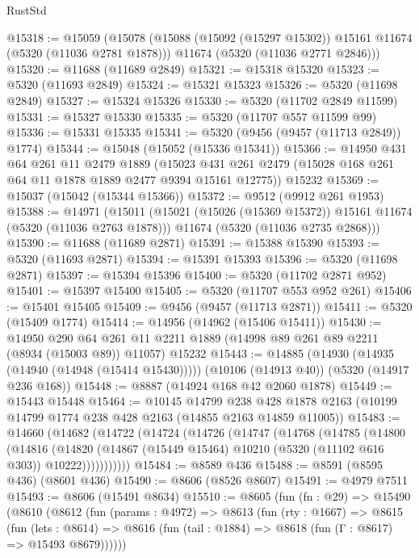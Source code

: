 \begin{lexlean}{RustStd}
\begin{coremodule}
@15318 := @15059
    (@15078
      (@15088 (@15092 (@15297 @15302)) @15161 @11674 (@5320 (@11036 @2781 @1878)))
      @11674
      (@5320 (@11036 @2771 @2846)))
@15320 := @11688 (@11689 @2849)
@15321 := @15318 @15320
@15323 := @5320 (@11693 @2849)
@15324 := @15321 @15323
@15326 := @5320 (@11698 @2849)
@15327 := @15324 @15326
@15330 := @5320 (@11702 @2849 @11599)
@15331 := @15327 @15330
@15335 := @5320 (@11707 @557 @11599 @99)
@15336 := @15331 @15335
@15341 := @5320 (@9456 (@9457 (@11713 @2849)) @1774)
@15344 := @15048 (@15052 (@15336 @15341))
@15366 := @14950
    @431
    @64
    @261
    @11
    @2479
    @1889
    (@15023 @431 @261 @2479 (@15028 @168 @261 @64 @11 @1878 @1889 @2477 @9394 @15161 @12775))
    @15232
@15369 := @15037 (@15042 (@15344 @15366))
@15372 := @9512 (@9912 @261 @1953)
@15388 := @14971
    (@15011
      (@15021 (@15026 (@15369 @15372)) @15161 @11674 (@5320 (@11036 @2763 @1878)))
      @11674
      (@5320 (@11036 @2735 @2868)))
@15390 := @11688 (@11689 @2871)
@15391 := @15388 @15390
@15393 := @5320 (@11693 @2871)
@15394 := @15391 @15393
@15396 := @5320 (@11698 @2871)
@15397 := @15394 @15396
@15400 := @5320 (@11702 @2871 @952)
@15401 := @15397 @15400
@15405 := @5320 (@11707 @553 @952 @261)
@15406 := @15401 @15405
@15409 := @9456 (@9457 (@11713 @2871))
@15411 := @5320 (@15409 @1774)
@15414 := @14956 (@14962 (@15406 @15411))
@15430 := @14950
    @290
    @64
    @261
    @11
    @2211
    @1889
    (@14998 @89 @261 @89 @2211 (@8934 (@15003 @89)) @11057)
    @15232
@15443 := @14885
    (@14930 (@14935 (@14940 (@14948 (@15414 @15430)))))
    (@10106 (@14913 @40))
    (@5320 (@14917 @236 @168))
@15448 := @8887 (@14924 @168 @42 @2060 @1878)
@15449 := @15443 @15448
@15464 := @10145
    @14799
    @238
    @428
    @1878
    @2163
    (@10199 @14799 @1774 @238 @428 @2163 (@14855 @2163 @14859 @11005))
@15483 := @14660
    (@14682
      (@14722
        (@14724
          (@14726
            (@14747
              (@14768
                (@14785
                  (@14800
                    (@14816
                      (@14820
                        (@14867 (@15449 @15464) @10210 (@5320 (@11102 @616 @303)) @10222)))))))))))
@15484 := @8589 @436
@15488 := @8591 (@8595 @436) (@8601 @436)
@15490 := @8606 (@8526 @8607)
@15491 := @4979 @7511
@15493 := @8606 (@15491 @8634)
@15510 := @8605
    (fun (fn : @29) =>
    @15490
      (@8610
        (@8612
          (fun (params : @4972) =>
          @8613
            (fun (rty : @1667) =>
            @8615
              (fun (lets : @8614) =>
              @8616 (fun (tail : @1884) => @8618 (fun (Γ : @8617) => @15493 @8679))))))

\end{coremodule}
\end{lexlean}

